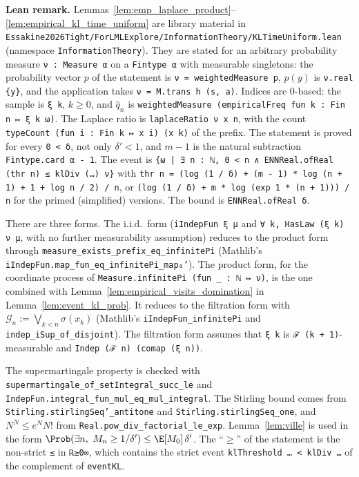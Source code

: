 \textbf{Lean remark.} Lemmas~\ref{lem:emp_laplace_product}--\ref{lem:empirical_kl_time_uniform}
are library material in \texttt{Essakine2026Tight/ForLMLExplore/InformationTheory/KLTimeUniform.lean}
(namespace \texttt{InformationTheory}). They are stated for an arbitrary probability measure
\texttt{ν : Measure α} on a \texttt{Fintype α} with measurable singletons: the probability vector
$p$ of the statement is \texttt{ν = weightedMeasure p}, $p(y)$ is \texttt{ν.real \{y\}}, and the
application takes \texttt{ν = M.trans h (s, a)}. Indices are $0$-based: the sample is
\texttt{ξ k}, $k \ge 0$, and $\hat q_n$ is
\texttt{weightedMeasure (empiricalFreq fun k : Fin n ↦ ξ k ω)}. The Laplace ratio is
\texttt{laplaceRatio ν x n}, with the count \texttt{typeCount (fun i : Fin k ↦ x i) (x k)} of the
prefix. The statement is proved for every \texttt{0 < δ}, not only $\delta' < 1$, and $m - 1$ is
the natural subtraction \texttt{Fintype.card α - 1}. The event is
\texttt{\{ω | ∃ n : ℕ, 0 < n ∧ ENNReal.ofReal (thr n) ≤ klDiv (…) ν\}} with
\texttt{thr n = (log (1 / δ) + (m - 1) * log (n + 1) + 1 + log n / 2) / n}, or
\texttt{(log (1 / δ) + m * log (exp 1 * (n + 1))) / n} for the primed (simplified) versions. The
bound is \texttt{ENNReal.ofReal δ}.

There are three forms. The i.i.d.\ form (\texttt{iIndepFun ξ μ} and
\texttt{∀ k, HasLaw (ξ k) ν μ}, with no further measurability assumption) reduces to the product
form through \texttt{measure\_exists\_prefix\_eq\_infinitePi} (Mathlib's
\texttt{iIndepFun.map\_fun\_eq\_infinitePi\_map₀'}). The product form, for the coordinate process of
\texttt{Measure.infinitePi (fun \_ : ℕ ↦ ν)}, is the one combined with
Lemma~\ref{lem:empirical_visits_domination} in Lemma~\ref{lem:event_kl_prob}. It reduces to the
filtration form with $\mathcal G_n := \bigvee_{k < n} \sigma(x_k)$ (Mathlib's
\texttt{iIndepFun\_infinitePi} and \texttt{indep\_iSup\_of\_disjoint}). The filtration form assumes
that \texttt{ξ k} is \texttt{ℱ (k + 1)}-measurable and \texttt{Indep (ℱ n) (comap (ξ n))}.

The supermartingale property is checked with \texttt{supermartingale\_of\_setIntegral\_succ\_le}
and \texttt{IndepFun.integral\_fun\_mul\_eq\_mul\_integral}. The Stirling bound comes from
\texttt{Stirling.stirlingSeq'\_antitone} and \texttt{Stirling.stirlingSeq\_one}, and
$N^N \le e^N N!$ from \texttt{Real.pow\_div\_factorial\_le\_exp}. Lemma~\ref{lem:ville} is used in
the form $\Prob(\exists n,\ M_n \ge 1/\delta') \le \E[M_0]\,\delta'$. The ``$\ge$'' of the
statement is the non-strict \texttt{≤} in \texttt{ℝ≥0∞}, which contains the strict event
\texttt{klThreshold … < klDiv …} of the complement of \texttt{eventKL}.

